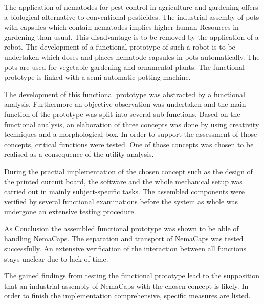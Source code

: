 \newpage
The application of nematodes for pest control in agriculture and gardening offers a biological alternative to conventional pesticides. The industrial assemby of pots with capsules which contain nematodes implies higher human Resources in gardening than usual. This disadvantage is to be removed by the application of a robot. The development of a functional prototype of such a robot is to be undertaken which doses and places nematode-capsules in pots automatically. The pots are used for vegetable gardening and ornamental plants. The functional prototype is linked with a semi-automatic potting machine.
\newline

The development of this functional prototype was abstracted by a functional analysis. Furthermore an objective observation was undertaken and the main-function of the prototype was split into several sub-functions. Based on the functional analysis, an elaboration of three concepts was done by using creativity techniques and a morphological box. In order to support the assessment of those concepts, critical functions were tested. One of those concepts was chosen to be realised as a consequence of the utility analysis.
\newline

During the practial implementation of the chosen concept such as the design of the printed curcuit board, the software and the whole mechanical setup was carried out in mainly subject-specific tasks. The assembled components were verified by several functional examinations before the system as whole was undergone an extensive testing procedure.
\newline

As Conclusion the assembled functional prototype was shown to be able of handling NemaCaps. The separation and transport of NemaCaps was tested successfully. An extensive verification of the  interaction between all functions stays unclear due to lack of time.
\newline

The gained findings from testing the functional prototype lead to the supposition that an industrial assembly of NemaCaps with the chosen concept is likely. In order to finish the implementation comprehensive, specific measures are listed.